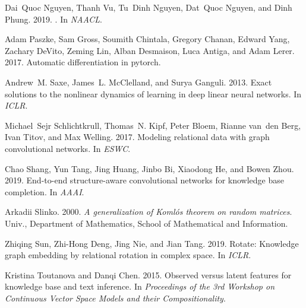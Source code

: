 \documentclass[11pt,a4paper]{article}
\begin{document}
\begin{thebibliography}{34}
Dai~Quoc Nguyen, Thanh Vu, Tu~Dinh Nguyen, Dat~Quoc Nguyen, and Dinh Phung.
  2019.
.
\newblock In \emph{NAACL}.

Adam Paszke, Sam Gross, Soumith Chintala, Gregory Chanan, Edward Yang, Zachary
  DeVito, Zeming Lin, Alban Desmaison, Luca Antiga, and Adam Lerer. 2017.
\newblock Automatic differentiation in pytorch.

Andrew~M. Saxe, James~L. McClelland, and Surya Ganguli. 2013.
\newblock Exact solutions to the nonlinear dynamics of learning in deep linear
  neural networks.
\newblock In \emph{ICLR}.

Michael~Sejr Schlichtkrull, Thomas~N. Kipf, Peter Bloem, Rianne van~den Berg,
  Ivan Titov, and Max Welling. 2017.
\newblock Modeling relational data with graph convolutional networks.
\newblock In \emph{ESWC}.

Chao Shang, Yun Tang, Jing Huang, Jinbo Bi, Xiaodong He, and Bowen Zhou. 2019.
\newblock End-to-end structure-aware convolutional networks for knowledge base
  completion.
\newblock In \emph{AAAI}.

Arkadii Slinko. 2000.
\newblock \emph{A generalization of Koml{\'o}s theorem on random matrices}.
\newblock Univ., Department of Mathematics, School of Mathematical and
  Information.

Zhiqing Sun, Zhi-Hong Deng, Jing Nie, and Jian Tang. 2019.
\newblock Rotate: Knowledge graph embedding by relational rotation in complex
  space.
\newblock In \emph{ICLR}.

Kristina Toutanova and Danqi Chen. 2015.
\newblock Observed versus latent features for knowledge base and text
  inference.
\newblock In \emph{Proceedings of the 3rd Workshop on Continuous Vector Space
  Models and their Compositionality}.


\end{thebibliography}
\end{document}
